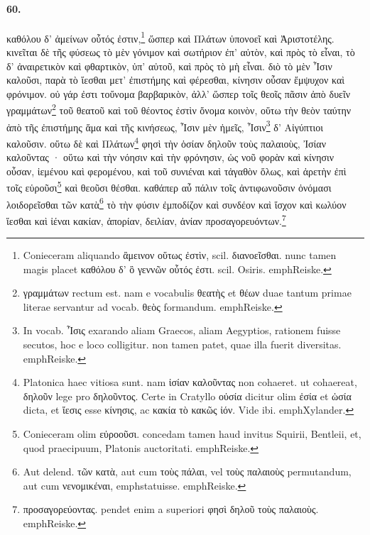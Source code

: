 \documentclass[a4paper, 11pt, oneside, polutonikogreek, german]{article}
\begin{document}
\paragraph{60.}
καθόλου δ' ἀμείνων οὗτός ἐστιν,\footnote{Conieceram aliquando ἂμεινον οὕτως ἐστὶν, scil. διανοεῖσθαι. nunc tamen magis placet καθόλου δ' ὃ γεννῶν οὗτός ἐστι. scil. Osiris. emph{Reiske.} } ὥσπερ καὶ Πλάτων ὑπονοεῖ καὶ Ἀριστοτέλης. κινεῖται δὲ τῆς φύσεως τὸ μὲν γόνιμον καὶ σωτήριον ἐπ' αὐτὸν, καὶ πρὸς τὸ εἶναι, τὸ δ' ἀναιρετικὸν καὶ φθαρτικὸν, ὑπ' αὐτοῦ, καὶ πρὸς τὸ μὴ εἶναι. διὸ τὸ μὲν Ἶσιν καλοῦσι, παρὰ τὸ ἵεσθαι μετ' ἐπιστήμης καὶ φέρεσθαι, κίνησιν οὖσαν ἔμψυχον καὶ φρόνιμον. οὐ γάρ ἐστι τοὔνομα βαρβαρικὸν, ἀλλ' ὥσπερ τοῖς θεοῖς πᾶσιν ἀπὸ δυεῖν γραμμάτων\footnote{γραμμάτων rectum est. nam e vocabulis θεατὴς et θέων duae tantum primae literae servantur ad vocab. θεὸς formandum. emph{Reiske.} } τοῦ θεατοῦ καὶ τοῦ θέοντος ἐστὶν ὄνομα κοινὸν, οὕτω τὴν θεὸν ταύτην ἀπὸ τῆς ἐπιστήμης ἅμα καὶ τῆς κινήσεως, Ἶσιν μὲν ἡμεῖς, Ἶσιν\footnote{In vocab. Ἶσις exarando aliam Graecos, aliam Aegyptios, rationem fuisse secutos, hoc e loco colligitur. non tamen patet, quae illa fuerit diversitas. emph{Reiske.}} δ' Αἰγύπτιοι καλοῦσιν. οὕτω δὲ καὶ Πλάτων\footnote{Platonica haec vitiosa sunt. nam ἰσίαν καλοῦντας non cohaeret. ut cohaereat, δηλοῦν lege pro δηλοῦντος. Certe in Cratyllo οὐσία dicitur olim ἐσία et ὡσία dicta, et ἴεσις esse κίνησις, ac κακία τὸ κακῶς ἰόν. Vide ibi. emph{Xylander.}} φησὶ τὴν ὁσίαν δηλοῦν τοὺς παλαιοὺς, Ἰσίαν καλοῦντας · οὕτω καὶ τὴν νόησιν καὶ τὴν φρόνησιν, ὡς νοῦ φορὰν καὶ κίνησιν οὖσαν, ἱεμένου καὶ φερομένου, καὶ τοῦ συνιέναι καὶ τἀγαθὸν ὅλως, καὶ ἀρετὴν ἐπὶ τοῖς εὑροῦσι\footnote{Conieceram olim εὐροοῦσι. concedam tamen haud invitus Squirii, Bentleii, et, quod praecipuum, Platonis auctoritati. emph{Reiske.}} καὶ θεοῦσι θέσθαι. καθάπερ αὖ πάλιν τοῖς ἀντιφωνοῦσιν ὀνόμασι λοιδορεῖσθαι τῶν κατὰ\footnote{Aut delend. τῶν κατὰ, aut cum τοὺς πάλαι, vel τοὺς παλαιοὺς permutandum, aut cum νενομικέναι, emph{statuisse}. emph{Reiske.} } τὸ τὴν φύσιν ἐμποδίζον καὶ συνδέον καὶ ἴσχον καὶ κωλύον ἵεσθαι καὶ ἰέναι κακίαν, ἀπορίαν, δειλίαν, ἀνίαν προσαγορευόντων.\footnote{προσαγορεύοντας. pendet enim a superiori φησὶ δηλοῦ τοὺς παλαιοὺς. emph{Reiske.}}
\end{document}
